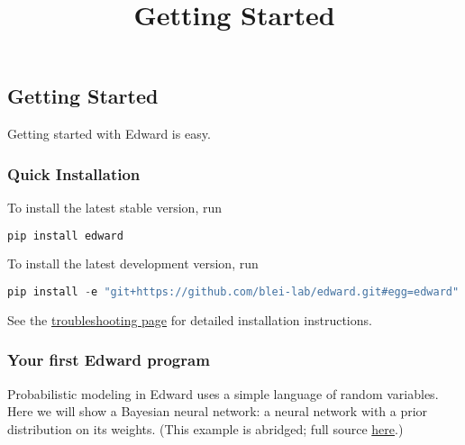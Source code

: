 \title{Getting Started}

\subsection{Getting Started}
Getting started with Edward is easy.

\subsubsection{Quick Installation}
To install the latest stable version, run

\begin{lstlisting}[language=Java]
pip install edward
\end{lstlisting}

To install the latest development version, run

\begin{lstlisting}[language=Java]
pip install -e "git+https://github.com/blei-lab/edward.git#egg=edward"
\end{lstlisting}

See the \href{/troubleshooting}{troubleshooting page} for detailed
installation instructions.


\subsubsection{Your first Edward program}

Probabilistic modeling in Edward uses a simple language of
random variables. Here we will show a Bayesian neural network: a neural
network with a prior distribution on its weights.
(This example is abridged; full source
\href{https://github.com/blei-lab/edward/blob/master/examples/getting_started_example.py}
{here}.)

